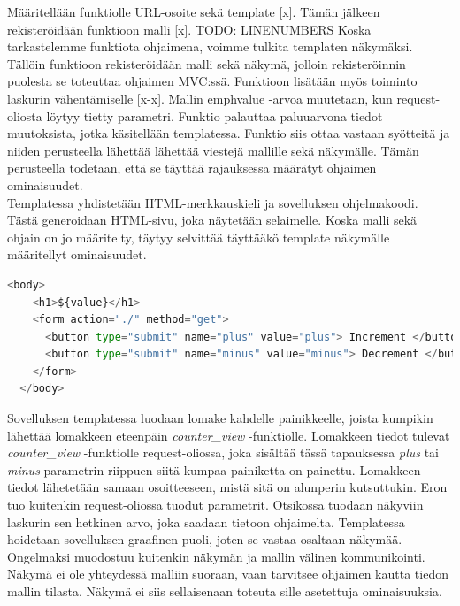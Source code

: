 \documentclass[finnish,utf8,nonumbib,palatino,kandi]{gradu2}
\begin{document}
Määritellään funktiolle URL-osoite sekä template [x]. Tämän jälkeen rekisteröidään funktioon malli [x]. TODO: LINENUMBERS Koska tarkastelemme funktiota ohjaimena, voimme tulkita templaten näkymäksi. Tällöin funktioon rekisteröidään malli sekä näkymä, jolloin rekisteröinnin puolesta se toteuttaa ohjaimen MVC:ssä. 
Funktioon lisätään myös toiminto laskurin vähentämiselle [x-x]. Mallin emph{value} -arvoa muutetaan, kun request-oliosta löytyy tietty parametri. Funktio palauttaa paluuarvona tiedot muutoksista, jotka käsitellään templatessa. Funktio siis ottaa vastaan syötteitä ja niiden perusteella lähettää lähettää viestejä
mallille sekä näkymälle. Tämän perusteella todetaan, että se täyttää rajauksessa määrätyt ohjaimen ominaisuudet. \\

Templatessa yhdistetään HTML-merkkauskieli ja sovelluksen ohjelmakoodi. Tästä generoidaan HTML-sivu, joka näytetään selaimelle. Koska malli sekä ohjain on jo määritelty, täytyy selvittää täyttääkö template näkymälle määritellyt ominaisuudet.  
\begin{lstlisting}[language=Python]      
  <body>                                                                        
    <h1>${value}</h1>                                                           
    <form action="./" method="get">                                            
      <button type="submit" name="plus" value="plus"> Increment </button>       
      <button type="submit" name="minus" value="minus"> Decrement </button>     
    </form>                                                                     
  </body>  
\end{lstlisting} 
Sovelluksen templatessa luodaan lomake kahdelle painikkeelle, joista kumpikin lähettää lomakkeen eteenpäin \emph{counter\_view} -funktiolle. Lomakkeen tiedot tulevat \emph{counter\_view} -funktiolle request-oliossa, joka sisältää tässä tapauksessa \emph{plus} tai \emph{minus} parametrin riippuen siitä kumpaa painiketta on painettu. Lomakkeen tiedot lähetetään samaan osoitteeseen, mistä sitä on alunperin kutsuttukin. Eron tuo kuitenkin request-oliossa tuodut parametrit.  Otsikossa tuodaan näkyviin laskurin sen hetkinen arvo, joka saadaan tietoon ohjaimelta.
 Templatessa hoidetaan sovelluksen graafinen puoli, joten se vastaa osaltaan näkymää. \\ Ongelmaksi muodostuu kuitenkin näkymän ja mallin välinen kommunikointi. Näkymä ei ole yhteydessä malliin suoraan, vaan tarvitsee ohjaimen kautta tiedon mallin tilasta.  Näkymä ei siis sellaisenaan toteuta sille asetettuja ominaisuuksia. \\
\end{document}
